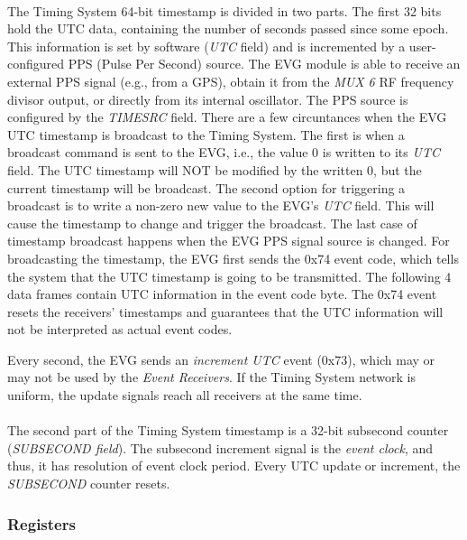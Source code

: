 \documentclass[openany]{article}
\begin{document}
			\paragraph{} The Timing System 64-bit timestamp is divided in two parts. The first 32 bits hold the UTC data, containing the number of seconds passed since some epoch. This information is set by software (\emph{UTC} field) and is incremented by a user-configured PPS (Pulse Per Second) source. The EVG module is able to receive an external PPS signal (e.g., from a GPS), obtain it from the \emph{MUX 6} RF frequency divisor output, or directly from its internal oscillator. The PPS source is configured by the \emph{TIMESRC} field. There are a few circuntances when the EVG UTC timestamp is broadcast to the Timing System. The first is when a broadcast command is sent to the EVG, i.e., the value 0 is written to its \emph{UTC} field. The UTC timestamp will NOT be modified by the written 0, but the current timestamp will be broadcast. The second option for triggering a broadcast is to write a non-zero new value to the EVG's \emph{UTC} field. This will cause the timestamp to change and trigger the broadcast. The last case of timestamp broadcast happens when the EVG PPS signal source is changed. For broadcasting the timestamp, the EVG first sends the 0x74 event code, which tells the system that the UTC timestamp is going to be transmitted. The following 4 data frames contain UTC information in the event code byte. The 0x74 event resets the receivers' timestamps and guarantees that the UTC information will not be interpreted as actual event codes.
			\par Every second, the EVG sends an \emph{increment UTC} event (0x73), which may or may not be used by the \emph{Event Receivers}. If the Timing System network is uniform, the update signals reach all receivers at the same time.
			\paragraph{} The second part of the Timing System timestamp is a 32-bit subsecond counter (\emph{SUBSECOND field}). The subsecond increment signal is the \emph{event clock}, and thus, it has resolution of event clock period. Every UTC update or increment, the \emph{SUBSECOND} counter resets.

		\subsubsection{Registers}\label{sec:evg-registers}
\end{document}
